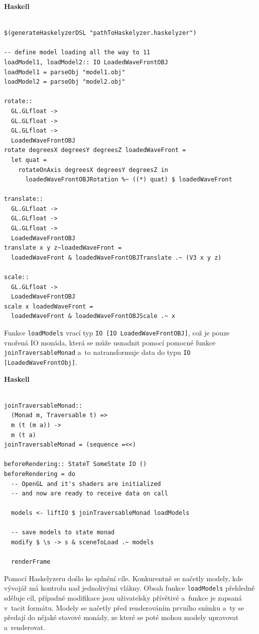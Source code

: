 \documentclass[male, czech]{kithesis}
\newcommand{\haskellInline}[1]{\colorbox{gray!10}{\texttt{#1}}}
\begin{document}
\textbf{Haskell}
\begin{verbatim}

$(generateHaskelyzerDSL "pathToHaskelyzer.haskelyzer")

-- define model loading all the way to 11
loadModel1, loadModel2:: IO LoadedWaveFrontOBJ
loadModel1 = parseObj "model1.obj"
loadModel2 = parseObj "model2.obj"

rotate:: 
  GL.GLfloat -> 
  GL.GLfloat -> 
  GL.GLfloat -> 
  LoadedWaveFrontOBJ
rotate degreesX degreesY degreesZ loadedWaveFront = 
  let quat = 
    rotateOnAxis degreesX degreesY degreesZ in 
      loadedWaveFrontOBJRotation %~ ((*) quat) $ loadedWaveFront 

translate:: 
  GL.GLfloat -> 
  GL.GLfloat -> 
  GL.GLfloat -> 
  LoadedWaveFrontOBJ
translate x y z~loadedWaveFront = 
  loadedWaveFront & loadedWaveFrontOBJTranslate .~ (V3 x y z)
      
scale:: 
  GL.GLfloat -> 
  LoadedWaveFrontOBJ
scale x loadedWaveFront = 
  loadedWaveFront & loadedWaveFrontOBJScale .~ x

\end{verbatim}

Funkce \haskellInline{loadModels} vrací typ \haskellInline{IO [IO LoadedWaveFrontOBJ]},
což je pouze vnořená IO monáda, 
která se může usnadnit pomocí pomocné funkce \haskellInline{joinTraversableMonad}
a~to natransformuje data do typu \haskellInline{IO [LoadedWaveFrontObj]}.

\textbf{Haskell}
\begin{verbatim}

joinTraversableMonad:: 
  (Monad m, Traversable t) => 
  m (t (m a)) -> 
  m (t a)
joinTraversableMonad = (sequence =<<)

beforeRendering:: StateT SomeState IO ()
beforeRendering = do
  -- OpenGL and it's shaders are initialized 
  -- and now are ready to receive data on call

  models <- liftIO $ joinTraversableMonad loadModels 

  -- save models to state monad
  modify $ \s -> s & sceneToLoad .~ models

  renderFrame

\end{verbatim}

Pomocí Haskelyzeru došlo ke splnění cíle.
Konkurentně se načetly modely, 
kde vývojář má kontrolu nad jednolivými vlákny.
Obsah funkce \haskellInline{loadModels} přehledně sděluje cíl,  
případné modifikace jsou uživatelsky přívětivé
a~funkce je zapsaná v~tacit formátu.
Modely se načetly před renderováním prvního snímku
a~ty se předají do nějaké stavové monády, 
ze které se poté mohou modely upravovat a~renderovat.
\end{document}
